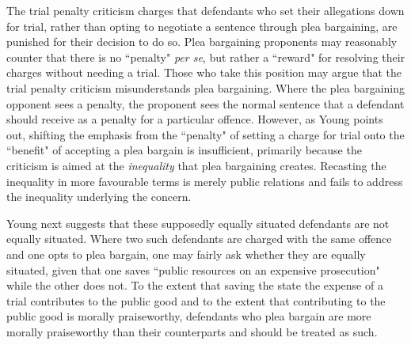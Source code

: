 The trial penalty criticism charges that defendants who set their allegations down for trial, rather than opting to negotiate a sentence through plea bargaining, are punished for their decision to do so. Plea bargaining proponents may reasonably counter that there is no ``penalty" \textit{per se}, but rather a ``reward" for resolving their charges without needing a trial. Those who take this position may argue that the trial penalty criticism misunderstands plea bargaining. Where the plea bargaining opponent sees a penalty, the proponent sees the normal sentence that a defendant should receive as a penalty for a particular offence. However, as Young points out, shifting the emphasis from the ``penalty" of setting a charge for trial onto the ``benefit" of accepting a plea bargain is insufficient, primarily because the criticism is aimed at the \textit{inequality} that plea bargaining creates. Recasting the inequality in more favourable terms is merely public relations and fails to address the inequality underlying the concern.

Young next suggests that these supposedly equally situated defendants are not equally situated. Where two such defendants are charged with the same offence and one opts to plea bargain, one may fairly ask whether they are equally situated, given that one saves ``public resources on an expensive prosecution" while the other does not. To the extent that saving the state the expense of a trial contributes to the public good and to the extent that contributing to the public good is morally praiseworthy, defendants who plea bargain are more morally praiseworthy than their counterparts and should be treated as such. 

